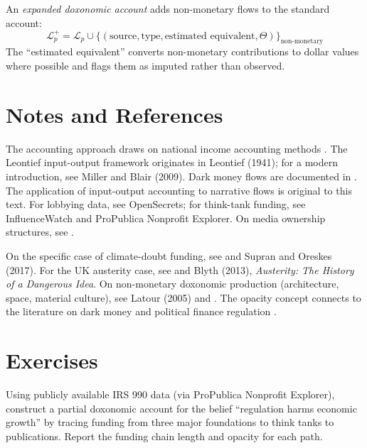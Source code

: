 \begin{definition}
\label{def:expanded-account}
An \emph{expanded doxonomic account} adds non-monetary flows to the standard account:
\[
  \mathcal{L}_p^+ = \mathcal{L}_p \cup \{(\text{source}, \text{type}, \text{estimated equivalent}, \Theta)\}_{\text{non-monetary}}
\]
The ``estimated equivalent'' converts non-monetary contributions to dollar values where possible and flags them as imputed rather than observed.
\end{definition}


\section{Notes and References}
\label{sec:ch14-notes}

The accounting approach draws on national income accounting methods \autocite{stiglitz2012}.
The Leontief input-output framework originates in Leontief (1941); for a modern introduction, see Miller and Blair (2009).
Dark money flows are documented in \textcite{mayer2016}.
The application of input-output accounting to narrative flows is original to this text.
For lobbying data, see OpenSecrets; for think-tank funding, see InfluenceWatch and ProPublica Nonprofit Explorer.
On media ownership structures, see \textcite{bagdikian2004}.

On the specific case of climate-doubt funding, see \textcite{oreskes2010} and Supran and Oreskes (2017).
For the UK austerity case, see \textcite{streeck2016} and Blyth (2013), \textit{Austerity: The History of a Dangerous Idea}.
On non-monetary doxonomic production (architecture, space, material culture), see Latour (2005) and \textcite{scott1998}.
The opacity concept connects to the literature on dark money and political finance regulation \autocite{mayer2016}.


\section{Exercises}

\begin{exercise}
Using publicly available IRS 990 data (via ProPublica Nonprofit Explorer), construct a partial doxonomic account for the belief ``regulation harms economic growth'' by tracing funding from three major foundations to think tanks to publications.
Report the funding chain length and opacity for each path.
\end{exercise}

